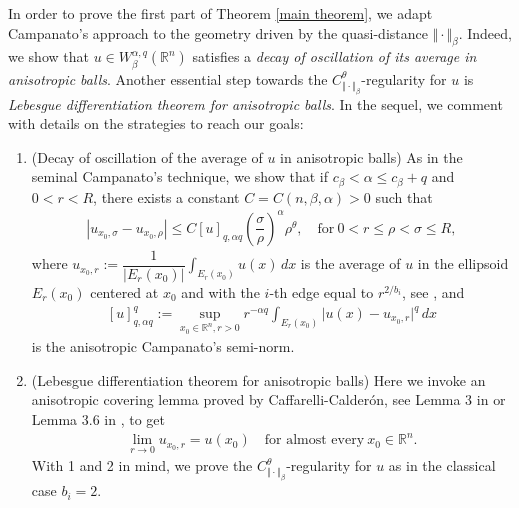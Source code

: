 \documentclass[10pt, leqno]{article}
\theoremstyle{definition}
\theoremstyle{remark}
\numberwithin{equation}{section}
\begin{document}
In order to prove the first part of Theorem \ref{main theorem}, we adapt Campanato's approach to the geometry driven by the quasi-distance $\Vert \cdot \Vert_{\beta}$. Indeed, we show that $u \in W_{\beta}^{\alpha, q}(\mathbb{R}^{n})$ satisfies a \textit{decay of oscillation of its average in anisotropic balls}. Another essential step towards the $C_{\Vert \cdot \Vert_{\beta}}^{\theta}$-regularity for $u$ is \textit{Lebesgue differentiation theorem for anisotropic balls}. In the sequel, we comment with details on the strategies to reach our goals:

\begin{enumerate}
\item (Decay of oscillation of the average of $u$ in anisotropic balls) As in the seminal Campanato's technique, we show that if $c_{\beta} < \alpha \leq c_{\beta} + q$ and $0 < r < R$, there exists a constant $C=C(n,\beta, \alpha) > 0$ such that
\begin{eqnarray}
\label{decay of average}
\left | u_{x_{0},\sigma} - u_{x_{0},\rho} \right | \leq C \left[ u \right]_{q, \alpha q}\left( \dfrac{\sigma}{\rho}\right)^{\alpha}  \rho^{\theta}, \quad \text{for} \ 0 < r \leq \rho < \sigma \leq R,
\end{eqnarray}
where $u_{x_{0},r}:= \dfrac{1}{\left | E_{r}(x_{0}) \right |}\displaystyle \int_{E_{r}(x_{0})}u(x)\, dx$ is the average of $u$ in the ellipsoid $E_{r}(x_{0})$ centered at $x_{0}$ and with the $i$-th edge equal to $r^{2/b_{i}}$, see \cite{BESOV-LIZORKIN, CLU, SL, LEITAO}, and
\begin{eqnarray}
\left[ u \right]^{q}_{q, \alpha q}:= \sup_{x_{0}\in \mathbb{R}^{n}, r>0} r^{-\alpha q}\displaystyle \int_{E_{r}(x_{0})}\vert u(x) - u_{x_{0},r} \vert^{q} \, dx
\end{eqnarray}
is the anisotropic Campanato's semi-norm.
\item (Lebesgue differentiation theorem for anisotropic balls) Here we invoke an anisotropic covering lemma proved by Caffarelli-Calder\' on, see Lemma 3 in \cite{CC} or Lemma 3.6 in \cite{CLU}, to get
\begin{eqnarray}
\displaystyle \lim_{r \rightarrow 0} u_{x_{0}, r} = u(x_{0}) \quad \text{for almost every}\ x_{0} \in \mathbb{R}^{n}.
\end{eqnarray}
With 1 and 2 in mind, we prove the $C^{\theta}_{\Vert \cdot \Vert_{\beta}}$-regularity for $u$ as in the classical case $b_{i}=2$.
\end{enumerate}
\end{document}
